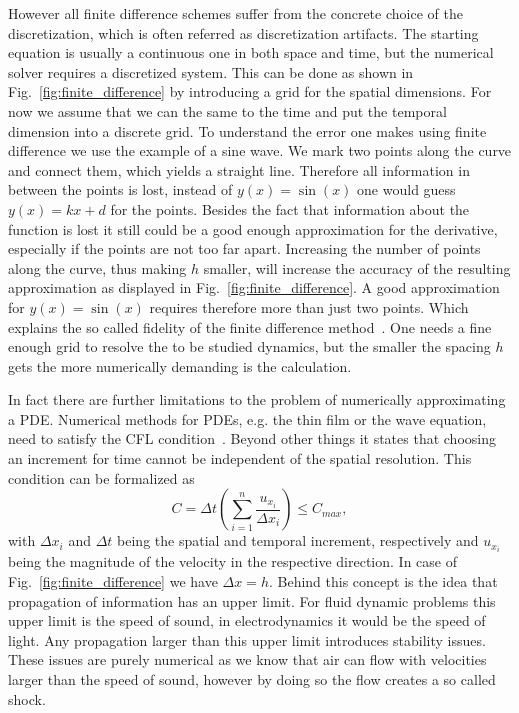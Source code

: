 However all finite difference schemes suffer from the concrete choice of the discretization, which is often referred as discretization artifacts.
The starting equation is usually a continuous one in both space and time, but the numerical solver requires a discretized system. 
This can be done as shown in Fig.~\ref{fig:finite_difference} by introducing a grid for the spatial dimensions. 
For now we assume that we can the same to the time and put the temporal dimension into a discrete grid. 
To understand the error one makes using finite difference we use the example of a sine wave. 
We mark two points along the curve and connect them, which yields a straight line. 
Therefore all information in between the points is lost, instead of $y(x) = \sin(x)$ one would guess $y(x) = kx + d$ for the points.
Besides the fact that information about the function is lost it still could be a good enough approximation for the derivative, especially if the points are not too far apart.
Increasing the number of points along the curve, thus making $h$ smaller, will increase the accuracy of the resulting approximation as displayed in Fig.~\ref{fig:finite_difference}.
A good approximation for $y(x) = \sin(x)$ requires therefore more than just two points.
Which explains the so called fidelity of the finite difference method~\cite{guruswamyReviewNumericalFluids2002}.
One needs a fine enough grid to resolve the to be studied dynamics, but the smaller the spacing $h$ gets the more numerically demanding is the calculation.

In fact there are further limitations to the problem of numerically approximating a PDE.
Numerical methods for PDEs, e.g. the thin film or the wave equation, need to satisfy the CFL condition~\cite{courantUeberPartiellenDifferenzengleichungen1928}.  
Beyond other things it states that choosing an increment for time cannot be independent of the spatial resolution.
This condition can be formalized as
\begin{equation}\label{eq:CFL}
    C = \Delta t \left(\sum_{i=1}^n \frac{u_{x_i}}{\Delta x_i}\right) \leq C_{max},
\end{equation}
with $\Delta x_i$ and $\Delta t$ being the spatial and temporal increment, respectively and $u_{x_i}$ being the magnitude of the velocity in the respective direction.
In case of Fig.~\ref{fig:finite_difference} we have $\Delta x = h$. 
Behind this concept is the idea that propagation of information has an upper limit.
For fluid dynamic problems this upper limit is the speed of sound, in electrodynamics it would be the speed of light.
Any propagation larger than this upper limit introduces stability issues.
These issues are purely numerical as we know that air can flow with velocities larger than the speed of sound, however by doing so the flow creates a so called shock.

